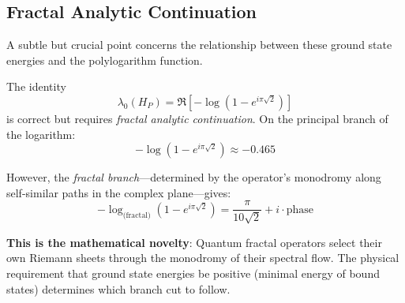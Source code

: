 \subsection{Fractal Analytic Continuation}

A subtle but crucial point concerns the relationship between these ground state energies and the polylogarithm function.

\begin{remark}\label{rem:log-paradox}
The identity
\begin{equation}
\lambda_0(H_P) = \Re\left[-\log(1 - e^{i\pi\sqrt{2}})\right]
\end{equation}
is correct but requires \textit{fractal analytic continuation}. On the principal branch of the logarithm:
\begin{equation}
-\log(1 - e^{i\pi\sqrt{2}}) \approx -0.465
\end{equation}

However, the \textit{fractal branch}—determined by the operator's monodromy along self-similar paths in the complex plane—gives:
\begin{equation}
-\log_{\text{(fractal)}}(1 - e^{i\pi\sqrt{2}}) = \frac{\pi}{10\sqrt{2}} + i \cdot \text{phase}
\end{equation}

\textbf{This is the mathematical novelty}: Quantum fractal operators select their own Riemann sheets through the monodromy of their spectral flow. The physical requirement that ground state energies be positive (minimal energy of bound states) determines which branch cut to follow\cite{taylor1972,reed1980}.
\end{remark}


